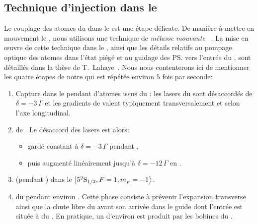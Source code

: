 \casse


	\subsection{Technique d'injection dans le \gm}\label{sec:InjectionGuide}
	Le couplage des atomes du \pmo dans le \gm est une étape délicate. De manière à mettre en mouvement le \pat, nous utilisons une technique de \emph{mélasse mouvante}%
~\cite{CSG91}. La mise en \oe uvre de cette technique dans le \setup, ainsi que les détails relatifs au pompage optique des atomes dans l'état piégé  et au guidage des \ps vers l'entrée du \gm, sont détaillés dans la thèse de T.~Lahaye~\cite{TTL}.
Nous nous contenterons ici de mentionner les quatre étapes de notre \seqexp qui est répétée environ 5 fois par seconde:
\begin{enumerate}
	\item Capture dans le \pmo pendant  d'atomes issus du \ZS : les lasers du \pmo sont désaccordés de $\delta=-3\,\Gamma$ et les gradients de \chm valent typiquement  transversalement et  selon l'axe longitudinal.
	\item {} de . Le désaccord des lasers est alors:
	\begin{itemize}
		\item gardé constant à $\delta=-3\,\Gamma$ pendant ,
		\item puis augmenté linéairement jusqu'à $\delta=-12\,\Gamma$ en .
	\end{itemize}
	\item {} (pendant ) dans le \snZ ${{\left| {{5^2 {\rm S}_{{1}/{2}}}, {F=1 , {m_{_F}}=-1} } \right\rangle}}$.
	\item {} du \pat pendant environ . Cette phase consiste à prévenir l'expansion transverse ainsi que la chute libre du \p avant son arrivée dans le guide dont l'entrée est située à  du \pmo. En pratique, un \gtchm d'environ  est produit par les bobines du \pmo.
\end{enumerate}
%
